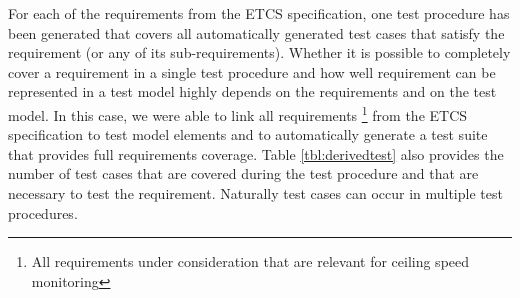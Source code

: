 For each of the requirements from the ETCS specification, one
test procedure has been generated that covers all automatically generated
test cases that satisfy the requirement (or any of its sub-requirements).
Whether it is possible to completely
cover a requirement in a single test procedure and how well
requirement can be represented in a test model highly depends on
the requirements and on the test model. In this case, we were able
to link all requirements
\footnote{All requirements under consideration that are relevant for ceiling speed monitoring}
from the ETCS specification to
test model elements and to automatically generate a test suite
that provides full requirements coverage.
Table \ref{tbl:derivedtest} also provides the number of test cases that
are covered during the test procedure and that are necessary
to test the requirement. Naturally test cases can occur in multiple
test procedures.

